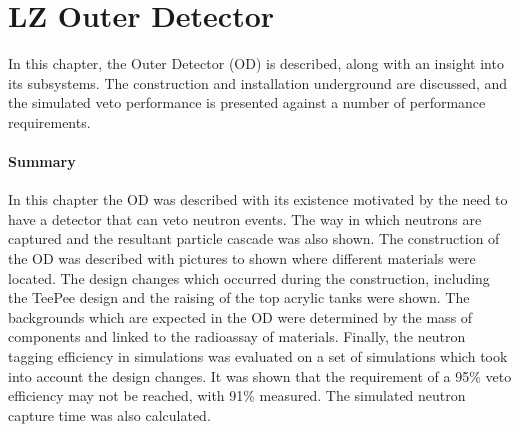 \chapter{LZ Outer Detector}
\label{chapter:lz_outer_detector}
\par
In this chapter, the Outer Detector (OD) is described, along with an insight into its subsystems.
The construction and installation underground are discussed, and the simulated veto performance is presented against a number of performance requirements.




\clearpage

\clearpage


\subsubsection*{Summary}

\par
In this chapter the OD was described with its existence motivated by the need to have a detector that can veto neutron events.
The way in which neutrons are captured and the resultant particle cascade was also shown.
The construction of the OD was described with pictures to shown where different materials were located.
The design changes which occurred during the construction, including the TeePee design and the raising of the top acrylic tanks were shown.
The backgrounds which are expected in the OD were determined by the mass of components and linked to the radioassay of materials.
Finally, the neutron tagging efficiency in simulations was evaluated on a set of simulations which took into account the design changes.
It was shown that the requirement of a 95\% veto efficiency may not be reached, with 91\% measured.
The simulated neutron capture time was also calculated.